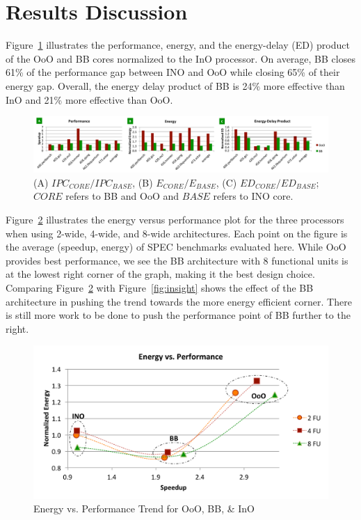 \section{Results Discussion}
\label{sec:discussion}


Figure~\ref{fig:overall} illustrates the performance, energy, and the
energy-delay (ED) product  of the OoO and BB cores normalized to the InO
processor.  On average, BB closes 61\% of the performance gap between INO and
OoO while closing 65\% of their energy gap. Overall, the energy delay product of
BB is 24\% more effective than InO and 21\% more effective than OoO.
\begin{figure}[h]
	\centering
	\includegraphics[width=\textwidth]{result/overall_perf.pdf} 
    \caption{(A) $IPC_{CORE}/IPC_{BASE}$, (B) $E_{CORE}/E_{BASE}$, (C)
        $ED_{CORE}/ED_{BASE}$; $CORE$ refers to BB and OoO and $BASE$ refers to
            INO core.}
	\label{fig:overall}
\end{figure}

Figure~\ref{fig:ep} illustrates the energy versus performance plot for the three
processors when using 2-wide, 4-wide, and 8-wide architectures. Each point on
the figure is the average (speedup, energy) of SPEC benchmarks evaluated here.
While OoO provides best performance, we see the BB architecture with 8
functional units is at the lowest right corner of the graph, making it the best
design choice. Comparing Figure~\ref{fig:ep} with Figure~\ref{fig:insight} shows
the effect of the BB architecture in pushing the trend towards the more energy
efficient corner. There is still more work to be done to push the performance
point of BB further to the right.
\begin{figure}[!htbp]
	\centering
	\includegraphics[width=1.0\columnwidth]{result/ep.pdf} 
    \caption{Energy vs. Performance Trend for OoO, BB, \& InO}
	\label{fig:ep}
\end{figure}

